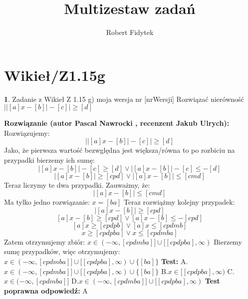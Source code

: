 \documentclass[12pt, a4paper]{article}
\title{Multizestaw zadań}
\author{Robert Fidytek}
\date{}
\theoremstyle{definition} %
\newtheorem{zad}{}
\newcommand{\kategoria}[1]{\section{#1}} %
\newcommand{\zadStart}[1]{\begin{zad}#1\newline} %
\newcommand{\zadStop}{\end{zad}}   %
\newcommand{\rozwStart}[2]{\noindent \textbf{Rozwiązanie (autor #1 , recenzent #2): }\newline} %
\newcommand{\odpStop}{\newline}                                             %
\newcommand{\testStart}{\noindent \textbf{Test:}\newline} %
\newcommand{\testStop}{\newline} %
\newcommand{\kluczStart}{\noindent \textbf{Test poprawna odpowiedź:}\newline} %
\newcommand{\kluczStop}{\newline} %
\begin{document}
\maketitle



\kategoria{Wikieł/Z1.15g}
\zadStart{Zadanie z Wikieł Z 1.15 g) moja wersja nr [nrWersji]}
Rozwiązać nierówność $\big||[a]x-[b]|-[c]\big|\geq[d]$
\zadStop
\rozwStart{Pascal Nawrocki}{Jakub Ulrych}
Rozwiązujemy:
$$\big||[a]x-[b]|-[c]\big|\geq[d]$$
Jako, że pierwsza wartość bezwględna jest większa/równa to po rozbiciu na przypadki bierzemy ich sumę:
$$|[a]x-[b]|-[c]\geq[d] \vee |[a]x-[b]|-[c]\leq-[d]$$
$$|[a]x-[b]|\geq[cpd] \vee |[a]x-[b]|\leq[cmd]$$
Teraz liczymy te dwa przypadki. Zauważmy, że:
$$|[a]x-[b]|\leq[cmd]$$ Ma tylko jedno rozwiązanie: $x=[ba]$\newline
Teraz rozwiążmy kolejny przypadek:
$$|[a]x-[b]|\geq[cpd]$$
$$[a]x-[b]\geq[cpd]\vee[a]x-[b]\leq-[cpd]$$
$$[a]x\geq[cpdpb]\vee[a]x\leq[cpdmb]$$
$$x\geq[cpdpba]\vee x\leq[cpdmba]$$
Zatem otrzymujemy zbiór: $x\in(-\infty,[cpdmba]]\cup[[cpdpba],\infty)$
Bierzemy sumę przypadków, więc otrzymujemy:
$x\in(-\infty,[cpdmba]]\cup[[cpdpba],\infty)\cup\{[ba]\}$
\odpStop
\testStart
A.$x\in(-\infty,[cpdmba]]\cup[[cpdpba],\infty)\cup\{[ba]\}$
B.$x\in[[cpdpba],\infty)$
C.$x\in(-\infty,[cpdmba]]$
D.$x\in(-\infty,[cpdmba]]\cup[[cpdpba],\infty)$
\testStop
\kluczStart
A
\kluczStop
\end{document}
